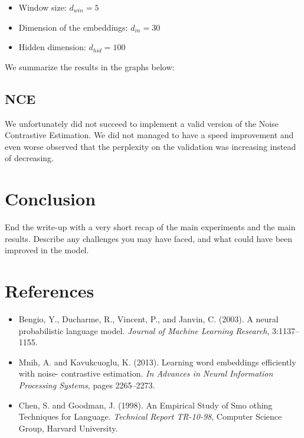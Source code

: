 \documentclass[11pt]{article}
\begin{document}
\begin{itemize}
\item Window size: $d_{win} = 5$
\item Dimension of the embeddings: $d_{in} = 30$
\item Hidden dimension: $d_{hid} = 100$
\end{itemize}

We summarize the results in the graphs below:
\subsection{NCE}

We unfortunately did not succeed to implement a valid version of the Noise Contrastive Estimation. We did not managed to have a speed improvement and even worse observed that the perplexity on the validation was increasing instead of decreasing.

\section{Conclusion}

End the write-up with a very short recap of the main experiments and the main results. Describe any challenges you may have faced, and what could have been improved in the model.

\section{References}
\begin{itemize}
\item Bengio, Y., Ducharme, R., Vincent, P., and Janvin, C. (2003). A neural probabilistic language model. \emph{Journal of Machine Learning Research}, 3:1137–1155.

\item Mnih, A. and Kavukcuoglu, K. (2013). Learning word embeddings efficiently with noise- contrastive estimation. \emph{In Advances in Neural Information Processing Systems}, pages 2265–2273.

\item Chen, S. and Goodman, J. (1998). An Empirical Study of Smo othing Techniques for Language. \emph{Technical Report TR-10-98}, Computer Science Group, Harvard University.
\end{itemize}
\end{document}

